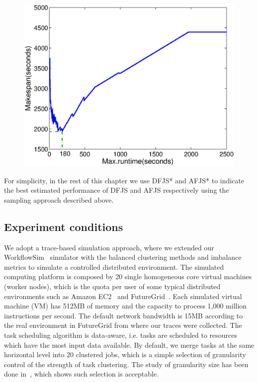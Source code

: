 \begin{figure}[!htb]
	\centering
	\includegraphics[width=.6\linewidth]{figures/balance/figure19.eps}
	\label{fig:evaluation_dfjs_montage}
\end{figure}

For simplicity, in the rest of this chapter we use DFJS* and AFJS* to indicate the best estimated performance of DFJS and AFJS respectively using the sampling approach described above.


\subsection{Experiment conditions}
\label{sec:balance:experiment_conditions}
We adopt a trace-based simulation approach, where we extended our WorkflowSim~\cite{WorkflowSim} simulator with the balanced clustering methods and imbalance metrics to simulate a controlled distributed environment. 
The simulated computing platform is composed by 20 single homogeneous core virtual machines (worker nodes), which is the quota per user of some typical distributed environments such as Amazon EC2~\cite{AmazonAWS} and FutureGrid~\cite{Fox2013FutureGrid}. Each simulated virtual machine (VM) has 512MB of memory and the capacity to process 1,000 million instructions per second. The default network bandwidth is 15MB according to the real environment in FutureGrid from where our traces were collected. The task scheduling algorithm is data-aware, i.e. tasks are scheduled to resources which have the most input data available. By default, we merge tasks at the same horizontal level into 20 clustered jobs, which is a simple selection of granularity control of the strength of task clustering. The study of granularity size has been done in~\cite{Chen2013b}, which shows such selection is acceptable. 

